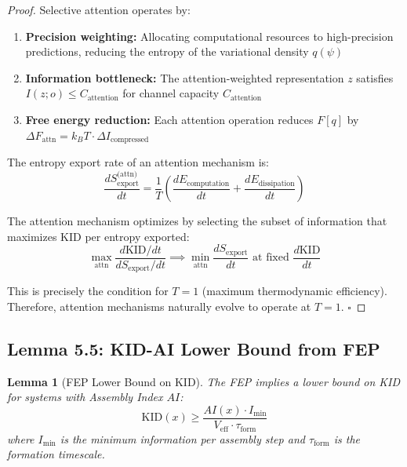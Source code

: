 \documentclass[11pt,a4paper]{article}
\newtheorem{lemma}[theorem]{Lemma}
\begin{document}
\begin{proof}
Selective attention operates by:
\begin{enumerate}[label=(\roman*)]
\item \textbf{Precision weighting:} Allocating computational resources to high-precision predictions, reducing the entropy of the variational density $q(\psi)$
\item \textbf{Information bottleneck:} The attention-weighted representation $z$ satisfies $I(z; o) \leq C_{\text{attention}}$ for channel capacity $C_{\text{attention}}$
\item \textbf{Free energy reduction:} Each attention operation reduces $F[q]$ by $\Delta F_{\text{attn}} = k_B T \cdot \Delta I_{\text{compressed}}$
\end{enumerate}

The entropy export rate of an attention mechanism is:
\begin{equation}
\frac{dS_{\text{export}}^{\text{(attn)}}}{dt} = \frac{1}{T}\left(\frac{dE_{\text{computation}}}{dt} + \frac{dE_{\text{dissipation}}}{dt}\right)
\end{equation}

The attention mechanism optimizes by selecting the subset of information that maximizes KID per entropy exported:
\begin{equation}
\max_{\text{attn}} \frac{d\text{KID}/dt}{dS_{\text{export}}/dt} \implies \min_{\text{attn}} \frac{dS_{\text{export}}}{dt} \text{ at fixed } \frac{d\text{KID}}{dt}
\end{equation}

This is precisely the condition for $T = 1$ (maximum thermodynamic efficiency). Therefore, attention mechanisms naturally evolve to operate at $T = 1$.
\hfill $\square$
\end{proof}

\subsection{Lemma 5.5: KID-AI Lower Bound from FEP}

\begin{lemma}[FEP Lower Bound on KID]
The FEP implies a lower bound on KID for systems with Assembly Index $AI$:
\begin{equation}
\text{KID}(x) \geq \frac{AI(x) \cdot I_{\min}}{V_{\text{eff}} \cdot \tau_{\text{form}}}
\end{equation}
where $I_{\min}$ is the minimum information per assembly step and $\tau_{\text{form}}$ is the formation timescale.
\end{lemma}
\end{document}
